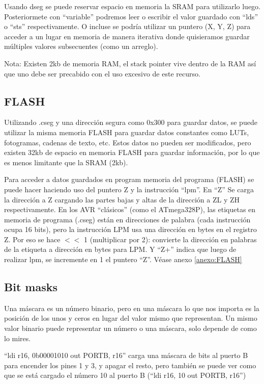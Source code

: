 Usando dseg se puede reservar espacio en memoria la SRAM para utilizarlo luego. Posteriormete con ``variable'' podremos leer o escribir el valor guardado con ``lds'' o ``sts'' respectivamente. O incluse se podría utilizar un puntero (X, Y, Z) para acceder a un lugar en memoria de manera iterativa donde quisieramos guardar múltiples valores subsecuentes (como un arreglo). 

Nota: Existen 2kb de memoria RAM, el stack pointer vive dentro de la RAM así que uno debe ser precabido con el uso excesivo de este recurso.

\subsection{FLASH}

Utilizando .cseg y una dirección segura como 0x300 para guardar datos, se puede utilizar la misma memoria FLASH para guardar datos constantes como LUTs, fotogramas, cadenas de texto, etc. Estos datos no pueden ser modificados, pero existen 32kb de espacio en memoria FLASH para guardar información, por lo que es menos limitante que la SRAM (2kb).

Para acceder a datos guardados en program memoria del programa (FLASH) se puede hacer haciendo uso del puntero Z y la instrucción ``lpm''. En ``Z'' Se carga la dirección a Z cargando las partes bajas y altas de la dirección a ZL y ZH respectivamente. En los AVR  ``clásicos'' (como el ATmega328P), las etiquetas en memoria de programa (.cseg) están en direcciones de palabra (cada instrucción ocupa 16 bits), pero la instrucción LPM usa una dirección en bytes en el registro Z. Por eso se hace $<$$<$ 1 (multiplicar por 2): convierte la dirección en palabras de la etiqueta a dirección en bytes para LPM. Y ``Z+'' indica que luego de realizar lpm, se incremente en 1 el puntero ``Z''. Véase anexo \ref{anexo:FLASH}

\subsection{Bit masks}
Una máscara es un número binario, pero en una máscara lo que nos importa es la posición de los unos y ceros en lugar del valor mismo que representan. Un mismo valor binario puede representar un número o una máscara, solo depende de como lo mires.  

``ldi r16, 0b00001010 out PORTB, r16'' carga una máscara de bits al puerto B para encender los pines 1 y 3, y apagar el resto, pero también se puede ver como que se está cargado el número 10 al puerto B (``ldi r16, 10 out PORTB, r16'')

